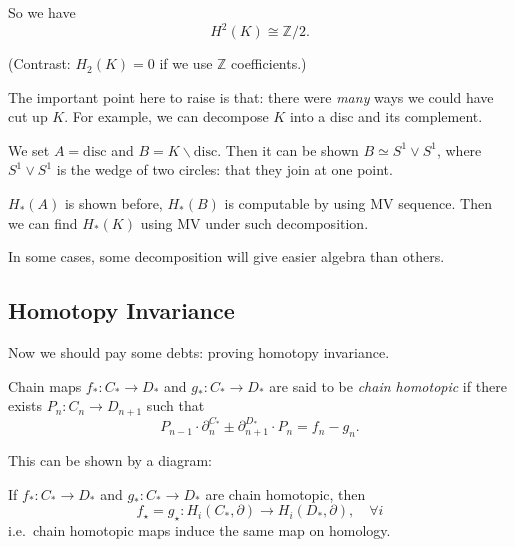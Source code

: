 \documentclass[a4paper,11pt]{article}
\begin{document}
	So we have
	\[
		H^2(K) \cong \mathbb{Z}/2.
	\]
	
	(Contrast: $H_2(K) = 0$ if we use $\mathbb{Z}$ coefficients.)

	\begin{nt}
		The important point here to raise is that: there were \emph{many} ways we could have cut up $K$. For example, we can decompose $K$ into a disc and its complement.


		We set $A = \text{disc}$ and $B = K \backslash \text{disc}$. Then it can be shown $B \simeq S^1 \vee S^1$,
		where $S^1 \vee S^1$ is the wedge of two circles: that they join at one point. 

		$H_*(A)$ is shown before, $H_*(B)$ is computable by using MV sequence. Then we can find $H_*(K)$ using MV under such decomposition.

		In some cases, some decomposition will give easier algebra than others.
	\end{nt}

	\subsection{Homotopy Invariance}

	Now we should pay some debts: proving homotopy invariance.

	\begin{defi}
		Chain maps $f_* : C_* \to D_*$ and $g_* : C_* \to D_*$ are said to be \emph{chain homotopic} if there exists $P_n : C_n \to D _{n+1}$ such that 
		\[
			P _{n-1} \cdot \partial_n ^{C_*} \pm \partial _{n+1}^{D_*} \cdot P_n = f_n - g_n.
		\]

		This can be shown by a diagram:
		\begin{center}
		\end{center}
	\end{defi}

	\begin{lem}
		If $f_* : C_* \to D_*$ and $g_* : C_* \to D_*$ are chain homotopic, then
		\[
			f_\star = g_\star : H_i(C_*, \partial) \to H_i(D_*, \partial), \quad \forall i
		\]
		i.e.\ chain homotopic maps induce the same map on homology.
	\end{lem}
\end{document}
